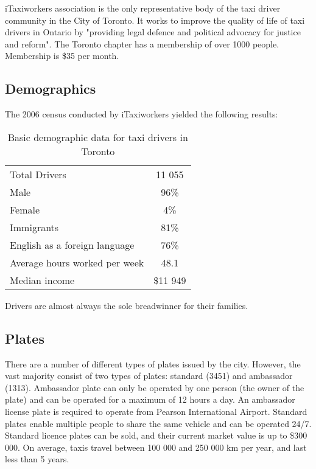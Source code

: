 \documentclass[11pt]{article}
\begin{document}
iTaxiworkers association is the only representative body of the taxi driver community in the City of Toronto. 
It works to improve the quality of life of taxi drivers in Ontario by "providing legal defence
and political advocacy for justice and reform"\cite{iTaxiWorkers2012}. The Toronto chapter
has a membership of over 1000 people. Membership is \$35 per month\cite{iTaxi2012, Abdiemail}.

\subsection{Demographics}
The 2006 census conducted by iTaxiworkers yielded the following results\cite{iTaxiWorkers2012}:
\begin{table}[h]
\centering
\caption{Basic demographic data for taxi drivers in Toronto}
\begin{tabular}{l c}
 Total Drivers & 11 055 \\
 Male & 96\% \\
 Female & 4\% \\
 Immigrants & 81\% \\
 English as a foreign language & 76\% \\
 Average hours worked per week & 48.1 \\
 Median income & \$11 949 \\
\end{tabular}
\end{table}

Drivers are almost always the sole breadwinner for their families\cite{Abdiphone}.

\subsection{Plates}
There are a number of different types of plates issued by the city. However, the vast majority 
consist of two types of plates: standard (3451) and ambassador (1313)\cite{thestat2012}. 
Ambassador plate can only be operated by one person (the owner of the plate) and can be 
operated for a maximum of 12 hours a day. An ambassador license plate is required to 
operate from Pearson International Airport. Standard plates enable multiple people to share the same vehicle
and can be operated 24/7. Standard licence plates can be sold, and their
current market value is up to \$300 000\cite{thestar2012}. On average, taxis travel between 100 000 and 
250 000 km per year\cite{thestar2012}, and last less than 5 years\cite{thestar}. 
\end{document}
